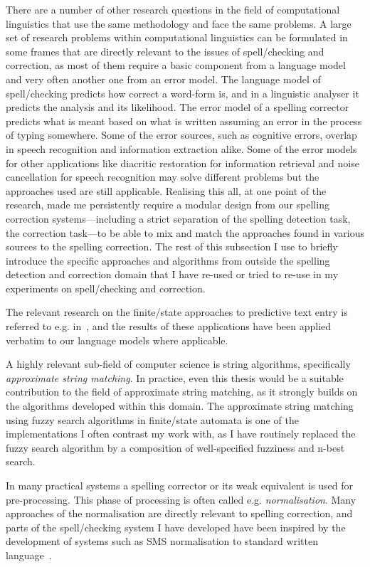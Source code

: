 \documentclass[officiallayout]{unihelcompling}
\begin{document}
There are a number of other research questions in the field of computational
linguistics that use the same methodology and face the same problems. A large
set of research problems within computational linguistics can be formulated in
some frames that are directly relevant to the issues of spell\-/checking and
correction, as most of them require a basic component from a language model and
very often another one from an error model. The language model of
spell\-/checking predicts how correct a word-form is, and in a linguistic
analyser it predicts the analysis and its likelihood. The error model of a
spelling corrector predicts what is meant based on what is written assuming an
error in the process of typing somewhere. Some of the error sources, such as
cognitive errors, overlap in speech recognition and information extraction
alike. Some of the error models for other applications like diacritic
restoration for information retrieval and noise cancellation for speech
recognition may solve different problems but the approaches used are still
applicable. Realising this all, at one point of the research, made me
persistently require a modular design from our spelling correction
systems---including a strict separation of the spelling detection task, the
correction task---to be able to mix and match the approaches found in various
sources to the spelling correction. The rest of this subsection I use to
briefly introduce the specific approaches and algorithms from outside the
spelling detection and correction domain that I have re-used or tried to
re-use in my experiments on spell\-/checking and correction.

The relevant research on the finite\-/state approaches to predictive text entry
is referred to e.g. in~\citet{silfverberg2010partofspeech,forcada2001corpus},
and the results of
these applications have been applied verbatim to our language models where
applicable.

A highly relevant sub-field of computer science is string algorithms,
specifically \emph{approximate string matching}. In practice, even this thesis
would be a suitable contribution to the field of approximate string matching,
as it strongly builds on the algorithms developed within this domain. The
approximate string matching using fuzzy search algorithms in finite\-/state
automata is one of the implementations I often contrast my work with, as I have
routinely replaced the fuzzy search algorithm by a composition of
well-specified fuzziness and n-best search.

In many practical systems a spelling corrector or its weak equivalent is used
for pre-processing. This phase of processing is often called e.g.
\emph{normalisation}. Many approaches of the normalisation are directly
relevant to spelling correction, and parts of the spell\-/checking system I
have developed have been inspired by the development of systems such as
SMS normalisation to standard written language~\citep{kobus2008normalizing}.
\end{document}
